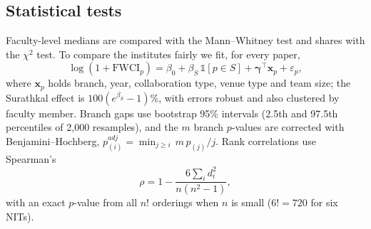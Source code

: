 \documentclass[10pt,twocolumn,a4paper]{article}
\begin{document}
\subsection{Statistical tests}
Faculty-level medians are compared with the Mann--Whitney test and shares with the $\chi^2$ test. To compare the institutes fairly we fit, for every
paper,
\begin{equation}\label{eq:reg}
\log(1+\mathrm{FWCI}_p)=\beta_0+\beta_S\,\mathbb{1}[p\in S]+\boldsymbol{\gamma}^{\top}\mathbf{x}_p+\varepsilon_p ,
\end{equation}
where $\mathbf{x}_p$ holds branch, year, collaboration type, venue type and team size; the Surathkal effect is $100(e^{\beta_S}-1)\%$, with errors
robust and also clustered by faculty member. Branch gaps use bootstrap 95\% intervals (2.5th and 97.5th percentiles of 2{,}000 resamples), and the
$m$ branch $p$-values are corrected with Benjamini--Hochberg, $p^{adj}_{(i)}=\min_{j\geq i}\, m\,p_{(j)}/j$. Rank correlations use Spearman's
\begin{equation}\label{eq:spearman}
\rho=1-\frac{6\sum_i d_i^2}{n(n^2-1)},
\end{equation}
with an exact $p$-value from all $n!$ orderings when $n$ is small ($6!=720$ for six NITs).
\end{document}
